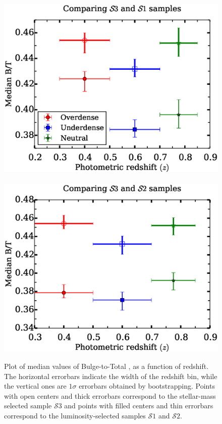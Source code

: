 \documentclass[twocolumn,useAMS,usenatbib]{mn2e}
\newcommand{\btt}{Bulge-to-Total }
\newcommand{\s}{\ensuremath{\mathcal{S}}}
\begin{document}
\begin{figure}
 \centering
 \includegraphics[width=1.0\columnwidth]{median_dvcbtt_wide} \
 \includegraphics[width=1.0\columnwidth]{median_dvcbtt2_wide} 
 \caption{ Plot of median values of \btt, as a function of redshift. The horizontal errorbars indicate
           the width of the redshift bin, while the vertical ones are $1\sigma$ errorbars obtained by
           bootstrapping. Points with open centers and thick errorbars correspond to the stellar-mass selected sample \s$3$
           and points with filled centers and thin errorbars correspond to the luminosity-selected samples \s$1$ and \s$2$.    
         }
  \label{fig:median_dvcbtt_wide}
\end{figure}
\end{document}
